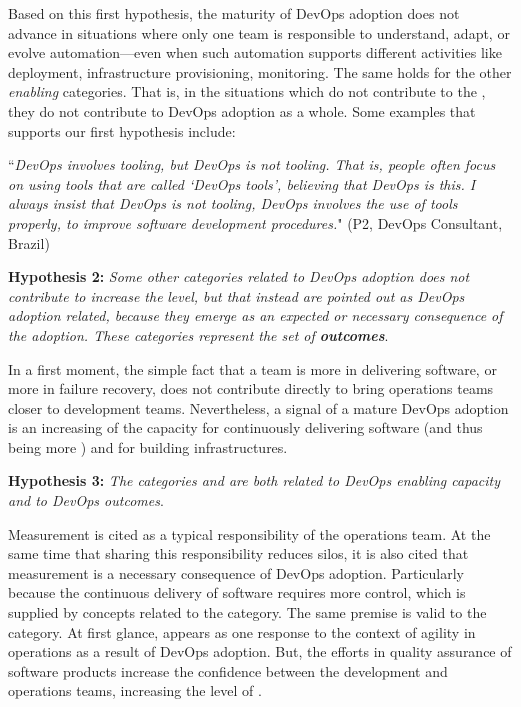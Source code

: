 Based on this first hypothesis, the maturity of DevOps adoption does not
advance in situations where only one team is responsible to understand, adapt, or
evolve automation---even when such automation supports different activities like deployment, infrastructure provisioning,
monitoring. The same holds for the other \emph{enabling} categories. That is, in the situations which
 do not contribute to
the \cc, they do not contribute to DevOps adoption as a whole. Some examples
that supports our first hypothesis include:

\begin{mq}
``\emph{DevOps involves tooling, but DevOps is not tooling. That is, people often
focus on using tools that are called `DevOps tools', believing that DevOps is
this. I always insist that DevOps is not tooling, DevOps involves the use of
tools properly, to improve software development procedures.}" (P2, DevOps
Consultant, Brazil)
\end{mq}

\begin{mh}
\textbf{Hypothesis 2:} \textit{Some other categories related to DevOps adoption
does not contribute to increase the} \cc \emph{level, but that instead are
pointed out as DevOps adoption related, because they emerge as an expected or
necessary consequence of the adoption. These categories represent the set of
\textbf{outcomes}}.
\end{mh}

In a first moment, the simple fact that a team is more
 in delivering software, or more  in failure recovery, does not
contribute directly to bring operations teams closer to development teams.
Nevertheless, a signal of a mature DevOps adoption is an increasing of the capacity for continuously
delivering software (and thus being more )
and for building  infrastructures.

\begin{mh}
\textbf{Hypothesis 3:} \textit{The categories  and 
are both related to DevOps enabling capacity and to DevOps outcomes}.
\end{mh}

Measurement is cited as a typical responsibility of the operations team.
At the same time that sharing this responsibility reduces silos,
it is also cited that measurement is a necessary consequence of DevOps adoption. Particularly because
the continuous delivery of software requires more control,
which is supplied by concepts related to the  category.
The same premise is valid to the  category. At first glance,
 appears as one response to the context of agility in operations
as a result of DevOps adoption. But, the efforts in quality assurance of software products
increase the confidence between the development and operations teams, increasing the level
of \cc.

